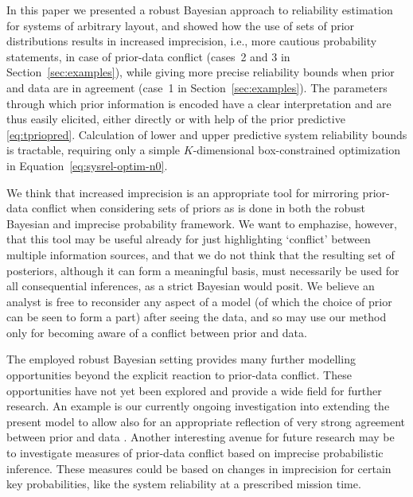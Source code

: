 \documentclass[Journal,letterpaper]{ascelike-new}
\begin{document}
In this paper we presented a robust Bayesian approach to reliability estimation for systems of arbitrary layout,
and showed how the use of sets of prior distributions results in increased imprecision,
i.e., more cautious probability statements, in case of prior-data conflict (cases~2 and 3 in Section~\ref{sec:examples}),
while giving more precise reliability bounds when prior and data are in agreement (case~1 in Section~\ref{sec:examples}).
The parameters through which prior information is encoded have a clear interpretation
and are thus easily elicited, either directly or with help of the prior predictive \eqref{eq:tpriopred}.
Calculation of lower and upper predictive system reliability bounds is tractable,
requiring only a simple $K$-dimensional box-constrained optimization in Equation~\eqref{eq:sysrel-optim-n0}.

We think that increased imprecision is an appropriate tool for mirroring prior-data conflict
when considering sets of priors as is done in both the robust Bayesian and imprecise probability framework.
We want to emphazise, however, that this tool may be useful already
for just highlighting `conflict' between multiple information sources,
and that we do not think that the resulting set of posteriors,
although it can form a meaningful basis, must necessarily be used
for all consequential inferences, as a strict Bayesian would posit.
We believe an analyst is free to reconsider any aspect of a model
(of which the choice of prior can be seen to form a part) after seeing the data,
and so may use our method only for becoming aware of a conflict between prior and data.

The employed robust Bayesian setting provides many further modelling opportunities
beyond the explicit reaction to prior-data conflict.
These opportunities have not yet been explored and
provide a wide field for further research.
An example is our currently ongoing investigation into
extending the present model to allow also for an appropriate reflection of very strong agreement between prior and data
\cite{ipmu2016}.
Another interesting avenue for future research may be to
investigate measures of prior-data conflict based on imprecise probabilistic inference.
These measures could be based on changes in imprecision for certain key probabilities,
like the system reliability at a prescribed mission time.
\end{document}

